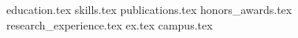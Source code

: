 \documentclass[11pt, a4paper]{awesome-cv}
\newcommand*{\sectiondir}{resume/}
\begin{document}
\makecvheader

{education.tex}
{skills.tex}
{publications.tex}
{honors_awards.tex}
{research_experience.tex}
{ex.tex}
{campus.tex}
\end{document}
